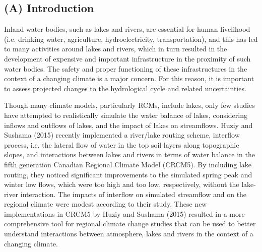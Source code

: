 \documentclass[a0,landscape]{a0poster}
\begin{document}
\vspace{0.5cm} %


\begin{multicols*}{3} %


\color{SaddleBrown} %

\section*{(A) Introduction}
Inland water bodies, such as lakes and rivers, are essential for human
livelihood (i.e. drinking water, agriculture, hydroelectricity, transportation),
and this has led to many activities around lakes and rivers, which in turn
resulted in the development of expensive and important infrastructure in the
proximity of such water bodies. The safety and proper functioning of these
infrastructures in the context of a changing climate is a major concern. For
this reason, it is important to assess projected changes to the hydrological
cycle and related uncertainties.

Though many climate models, particularly RCMs, include lakes, only few studies
have attempted to realistically simulate the water balance of lakes, considering
inflows and outflows of lakes, and the impact of lakes on streamflows. Huziy and
Sushama (2015) recently implemented a river/lake routing scheme, interflow
process, i.e. the lateral flow of water in the top soil layers along topographic
slopes, and interactions between lakes and rivers in terms of water balance in
the fifth generation Canadian Regional Climate Model (CRCM5). By including lake
routing, they noticed significant improvements to the simulated spring peak and
winter low flows, which were too high and too low, respectively, without the
lake-river interaction. The impacts of interflow on simulated streamflow and on
the regional climate were modest according to their study. These new
implementations in CRCM5 by Huziy and Sushama (2015) resulted in a more
comprehensive tool for regional climate change studies that can be used to
better understand interactions between atmosphere, lakes and rivers in the
context of a changing climate.


\end{multicols*}
\end{document}
